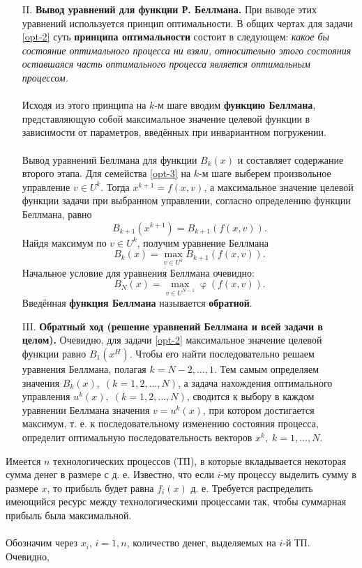 \documentclass[a4paper, 12pt]{report}
\numberwithin{equation}{section}
\renewcommand{\varphi}{\upvarphi}
\begin{document}
\begin{enumerate}
\item[II.] \textbf{Вывод уравнений для функции Р. Беллмана.}
При выводе этих уравнений используется принцип оптимальности. В общих чертах для задачи \eqref{opt-2} суть \textbf{принципа оптимальности} состоит в следующем: \textit{какое бы состояние оптимального процесса ни взяли, относительно этого состояния оставшаяся часть оптимального процесса является оптимальным процессом.}
\\\\
Исходя из этого принципа на $k$-м шаге вводим \textbf{функцию Беллмана}, представляющую собой максимальное значение целевой функции в зависимости от параметров, введённых при инвариантном погружении.
\\\\
Вывод уравнений Беллмана для функции $B_k(x)$ и составляет содержание второго этапа.
Для семейства \eqref{opt-3} на $k$-м шаге выберем произвольное управление $v \in U^k$. Тогда $x^{k+1} = f(x, v)$, а максимальное значение целевой функции задачи при выбранном управлении, согласно определению функции Беллмана, равно
\[
B_{k+1}(x^{k+1}) = B_{k+1}(f(x, v)).
\]
Найдя максимум по $v \in U^k$, получим уравнение Беллмана
\[
B_k(x) = \max_{v \in U^k} B_{k+1}(f(x, v)).
\]
Начальное условие для уравнения Беллмана очевидно:
\[
B_N(x) = \max_{v \in U^{N-1}} \varphi(f(x, v)).
\]
Введённая \textbf{функция Беллмана} называется \textbf{обратной}.
\item [III.] \textbf{Обратный ход (решение уравнений Беллмана и всей задачи в целом).}
Очевидно, для задачи \eqref{opt-2} максимальное значение целевой функции равно $B_1(x^H)$. Чтобы его найти последовательно решаем уравнения Беллмана, полагая $k = N-2, \ldots, 1$. Тем самым определяем значения $B_k(x),\; (k=1,2,\ldots,N)$, а задача нахождения оптимального управления $u^k(x),\; (k=1,2,\ldots,N)$, сводится к выбору в каждом уравнении Беллмана значения $v = u^k(x)$, при котором достигается максимум, т. е. к последовательному изменению состояния процесса, определит оптимальную последовательность векторов $x^k,\; k=1,\ldots,N$.
\end{enumerate}
Имеется $n$ технологических процессов (ТП), в которые вкладывается некоторая сумма
денег в размере с д. е. Известно, что если $i$-му процессу выделить сумму в размере $x$, то прибыль будет равна $f_i(x)$
д. е. Требуется распределить имеющийся ресурс между
технологическими процессами так, чтобы суммарная прибыль была максимальной.
\\\\
Обозначим через $x_i$, $i=1,n$, количество денег, выделяемых на $i$-й ТП. Очевидно,
\end{document}
